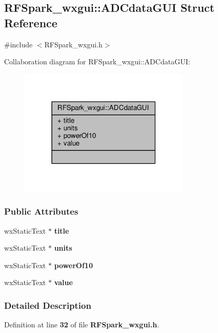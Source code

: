 \subsection{R\+F\+Spark\+\_\+wxgui\+:\+:A\+D\+Cdata\+G\+UI Struct Reference}
\label{structRFSpark__wxgui_1_1ADCdataGUI}


{\ttfamily \#include $<$R\+F\+Spark\+\_\+wxgui.\+h$>$}



Collaboration diagram for R\+F\+Spark\+\_\+wxgui\+:\+:A\+D\+Cdata\+G\+UI\+:
\nopagebreak
\begin{figure}[H]
\begin{center}
\leavevmode
\includegraphics[width=231pt]{d1/d27/structRFSpark__wxgui_1_1ADCdataGUI__coll__graph}
\end{center}
\end{figure}
\subsubsection*{Public Attributes}
\begin{DoxyCompactItemize}
\item 
wx\+Static\+Text $\ast$ {\bf title}
\item 
wx\+Static\+Text $\ast$ {\bf units}
\item 
wx\+Static\+Text $\ast$ {\bf power\+Of10}
\item 
wx\+Static\+Text $\ast$ {\bf value}
\end{DoxyCompactItemize}


\subsubsection{Detailed Description}


Definition at line {\bf 32} of file {\bf R\+F\+Spark\+\_\+wxgui.\+h}.



